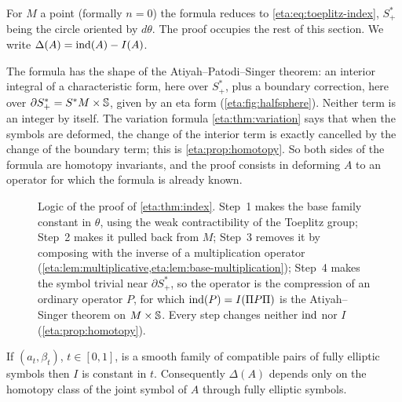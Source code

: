 For $M$ a point (formally $n=0$) the formula reduces to \eqref{eta:eq:toeplitz-index},
$S^*_+$ being the circle oriented by $d\theta$. The proof occupies the rest of this
section. We write $\Delta(A)=\operatorname{ind}(A)-I(A)$.

\begin{discussion}
  The formula has the shape of the Atiyah--Patodi--Singer theorem: an interior
  integral of a characteristic form, here over $S^*_+$, plus a boundary
  correction, here over $\partial S^*_+=S^*M\times\mathbb{S}$, given by an eta form
  (\cref{eta:fig:halfsphere}). Neither term is an integer by itself. The variation
  formula \cref{eta:thm:variation} says that when the symbols are deformed, the
  change of the interior term is exactly cancelled by the change of the boundary
  term; this is \cref{eta:prop:homotopy}. So both sides of the formula are
  homotopy invariants, and the proof consists in deforming $A$ to an operator for
  which the formula is already known.
\end{discussion}

\begin{figure}[ht]
\centering
{}
\caption[Proof of the eta index formula]{Logic of the proof of
\cref{eta:thm:index}. Step~1 makes the base family constant in $\theta$, using the
weak contractibility of the Toeplitz group; Step~2 makes it pulled back from $M$;
Step~3 removes it by composing with the inverse of a multiplication operator
(\cref{eta:lem:multiplicative,eta:lem:base-multiplication}); Step~4 makes the
symbol trivial near $\partial S^*_+$, so the operator is the compression of an
ordinary operator $P$, for which $\operatorname{ind}(P)=I(\Pi P\Pi)$ is the Atiyah--Singer theorem on
$M\times\mathbb{S}$. Every step changes neither $\operatorname{ind}$ nor $I$
(\cref{eta:prop:homotopy}).}
\label{eta:fig:proof}
\end{figure}

\begin{proposition}\label{eta:prop:homotopy}
If $(a_t,\beta_t)$, $t\in[0,1]$, is a smooth family of compatible pairs of fully
elliptic symbols then $I$ is constant in $t$. Consequently $\Delta(A)$ depends only on
the homotopy class of the joint symbol of $A$ through fully elliptic symbols.
\end{proposition}

